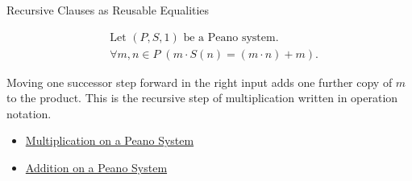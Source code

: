 \begin{topicbox}{Recursive Clauses as Reusable Equalities}
\begin{remark*}
\[
\begin{aligned}
&\text{Let } (P,S,1) \text{ be a Peano system.}\\
&\forall m,n \in P\;(m \cdot S(n) = (m \cdot n) + m).
\end{aligned}
\]
\end{remark*}

\begin{remark*}[Interpretation]
Moving one successor step forward in the right input adds one further copy of
$m$ to the product. This is the recursive step of multiplication written in
operation notation.
\end{remark*}

\begin{dependencies}
\begin{itemize}
  \item \hyperref[def:multiplication-on-peano-system]{Multiplication on a Peano System}
  \item \hyperref[def:addition-on-peano-system]{Addition on a Peano System}
\end{itemize}
\end{dependencies}
\end{topicbox}

